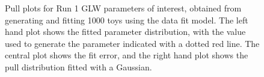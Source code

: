\begin{figure}
\begin{tabular}{c}
  \end{tabular}
  \caption{Pull plots for Run 1 GLW parameters of interest, obtained from generating and fitting 1000 toys using the data fit model. The left hand plot shows the fitted parameter distribution, with the value used to generate the parameter indicated with a dotted red line. The central plot shows the fit error, and the right hand plot shows the pull distribution fitted with a Gaussian.}
\label{fig:GLW_run1_pulls}
\end{figure}
